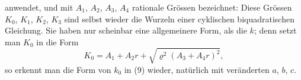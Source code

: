 anwendet, und mit $A_1$, $A_2$, $A_3$, $A_4$ rationale Grössen bezeichnet:
Diese Grössen $K_0$, $K_1$, $K_2$, $K_3$ sind selbst wieder die Wurzeln einer cyklischen biquadratischen Gleichung. Sie haben nur scheinbar eine allgemeinere Form, als die $k$; denn setzt man $K_0$ in die Form
\[
K_0 = A_1 + A_2 r + \sqrt{\varrho^2(A_3+A_4 r)^2},
\]
so erkennt man die Form von $k_0$ in (9) wieder, natürlich mit veränderten $a$, $b$, $c$.
